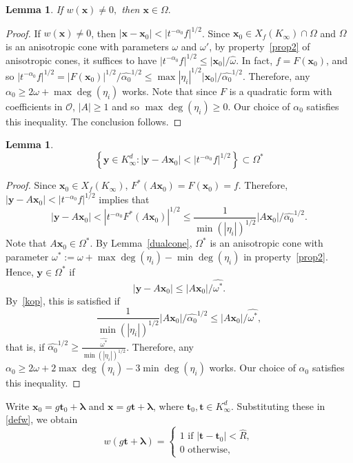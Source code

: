 \documentclass[10pt]{amsart}
\theoremstyle{plain}
\theoremstyle{plain}
\newtheorem{lemma}[theorem]{Lemma}
\renewcommand{\vec}[1]{\mathbf{#1}}
\theoremstyle{remark}
\theoremstyle{definition}
\renewcommand{\hat}{\widehat}
\newcommand{\Ki}{K_\infty}
\newcommand{\hR}{\widehat{R}}
\begin{document}
\begin{lemma}
If $w(\vec{x})\neq 0,$  then $\vec{x}\in \Omega.$  
\end{lemma}
\begin{proof}If $w(\vec{x})\neq 0$, then $|\vec{x}-\vec{x}_0|<|t^{-\alpha_0}f|^{1/2}$. Since $\vec{x}_0\in X_f(\Ki)\cap\Omega$ and $\Omega$ is an anisotropic cone with parameters $\omega$ and $\omega'$, by property~\eqref{prop2} of anisotropic cones, it suffices to have $|t^{-\alpha_0}f|^{1/2}\leq |\vec{x}_0|/\hat{\omega}$. In fact, $f=F(\vec{x}_0)$, and so $|t^{-\alpha_0}f|^{1/2}=|F(\vec{x}_0)|^{1/2}/\hat{\alpha_0}^{1/2}\leq\max|\eta_i|^{1/2}|\vec{x}_0|/\hat{\alpha_0}^{1/2}$. Therefore, any $\alpha_0\geq 2\omega+\max\deg(\eta_i)$ works. Note that since $F$ is a quadratic form with coefficients in $\mathcal{O}$, $|A|\geq 1$ and so $\max\deg(\eta_i)\geq 0$. Our choice of $\alpha_0$ satisfies this inequality. The conclusion follows.
\end{proof}
\begin{lemma}
$$\left\{\vec{y}\in K_\infty^d: |\vec{y}-A\vec{x}_0|<  |t^{-\alpha_0}f|^{1/2} \right\}  \subset  \Omega^*$$
\end{lemma}
\begin{proof}
Since $\vec{x}_0\in X_f(\Ki)$, $F^*(A\vec{x}_0)=F(\vec{x}_0)=f$. Therefore, $|\vec{y}-A\vec{x}_0|<|t^{-\alpha_0}f|^{1/2}$ implies that
\begin{equation}\label{kop}|\vec{y}-A\vec{x}_0|<|t^{-\alpha_0}F^*(A\vec{x}_0)|^{1/2}\leq \frac{1}{\min(|\eta_i|)^{1/2}}|A\vec{x}_0|/\hat{\alpha_0}^{1/2}.\end{equation}
Note that $A\vec{x}_0\in\Omega^*$. By Lemma~\ref{dualcone}, $\Omega^*$ is an anisotropic cone with parameter $\omega^*:=\omega+\max\deg(\eta_i)-\min\deg(\eta_i)$ in property~\eqref{prop2}. Hence, $\vec{y}\in\Omega^*$ if 
\[|\vec{y}-A\vec{x}_0|\leq |A\vec{x}_0|/\hat{\omega^*}.\]
By~\eqref{kop}, this is satisfied if
\[\frac{1}{\min(|\eta_i|)^{1/2}}|A\vec{x}_0|/\hat{\alpha_0}^{1/2}\leq |A\vec{x}_0|/\hat{\omega^*},\]
that is, if $\hat{\alpha_0}^{1/2}\geq \frac{\hat{\omega^*}}{\min(|\eta_i|)^{1/2}}$. Therefore, any $\alpha_0\geq 2\omega+2\max\deg(\eta_i)-3\min\deg(\eta_i)$ works. Our choice of $\alpha_0$ satisfies this inequality. 
\end{proof}
Write $\vec{x}_0=g\vec{t}_0+\boldsymbol{\lambda}$ and $\vec{x}=g\vec{t}+\boldsymbol{\lambda}$, where $\vec{t}_0, \vec{t}\in\Ki^d$. Substituting these in \eqref{defw}, we obtain 
\[
w(g\vec{t}+\boldsymbol{\lambda})=\begin{cases}
1 \text{ if } |\vec{t}-\vec{t}_0|  < \hR,
\\
0 \text{ otherwise,}
\end{cases}
\]
\end{document}
